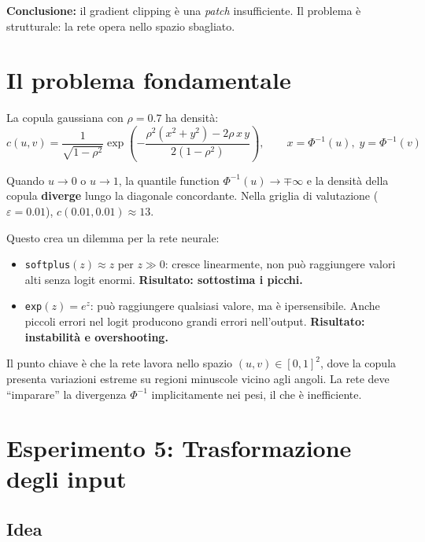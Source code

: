\documentclass[11pt, a4paper]{article}
\begin{document}
\textbf{Conclusione:} il gradient clipping è una \emph{patch} insufficiente. Il problema è strutturale: la rete opera nello spazio sbagliato.

\section{Il problema fondamentale}

La copula gaussiana con $\rho = 0.7$ ha densità:
\[
c(u,v) = \frac{1}{\sqrt{1-\rho^2}} \exp\!\left(-\frac{\rho^2(x^2+y^2) - 2\rho\, x\, y}{2(1-\rho^2)}\right), \qquad x = \Phi^{-1}(u),\; y = \Phi^{-1}(v)
\]

Quando $u \to 0$ o $u \to 1$, la quantile function $\Phi^{-1}(u) \to \mp\infty$ e la densità della copula \textbf{diverge} lungo la diagonale concordante. Nella griglia di valutazione ($\varepsilon = 0.01$), $c(0.01, 0.01) \approx 13$.

Questo crea un dilemma per la rete neurale:
\begin{itemize}
    \item \texttt{softplus}$(z) \approx z$ per $z \gg 0$: cresce linearmente, non può raggiungere valori alti senza logit enormi. \textbf{Risultato: sottostima i picchi.}
    \item \texttt{exp}$(z) = e^z$: può raggiungere qualsiasi valore, ma è ipersensibile. Anche piccoli errori nel logit producono grandi errori nell'output. \textbf{Risultato: instabilità e overshooting.}
\end{itemize}

Il punto chiave è che la rete lavora nello spazio $(u,v) \in [0,1]^2$, dove la copula presenta variazioni estreme su regioni minuscole vicino agli angoli. La rete deve ``imparare'' la divergenza $\Phi^{-1}$ implicitamente nei pesi, il che è inefficiente.

\section{Esperimento 5: Trasformazione degli input}

\subsection{Idea}
\end{document}
